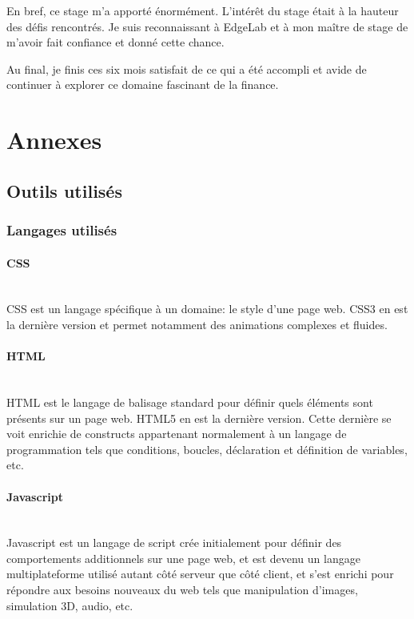 \documentclass[a4paper,french,12pt]{article}
\begin{document}
	En bref, ce stage m'a apporté énormément. L'intérêt du stage était à la hauteur des défis rencontrés.
	Je suis reconnaissant à EdgeLab et à mon maître de stage de m'avoir fait confiance et donné cette chance.

	Au final, je finis ces six mois satisfait de ce qui a été accompli et avide de continuer à explorer ce domaine fascinant de la finance.
	\newpage
\section{Annexes}

	\subsection{Outils utilisés}

		\subsubsection{Langages utilisés}
		
			\paragraph{CSS}~\\	
			CSS est un langage spécifique à un domaine: le style d'une page web. CSS3 en est la dernière version et permet notamment des animations complexes et fluides.
			
			\paragraph{HTML}~\\	
			HTML est le langage de balisage standard pour définir quels éléments sont présents sur un page web. HTML5 en est la dernière version. Cette dernière se voit enrichie de constructs appartenant normalement à un langage de programmation tels que conditions, boucles, déclaration et définition de variables, etc.
			
		
			\paragraph{Javascript}~\\	
			Javascript est un langage de script crée initialement pour 
			définir des comportements additionnels sur une page web, et 				est devenu un langage multiplateforme utilisé autant côté serveur que côté client, et s'est enrichi pour répondre aux besoins nouveaux du web tels que manipulation d'images, simulation 3D, audio, etc.
			
\end{document}

